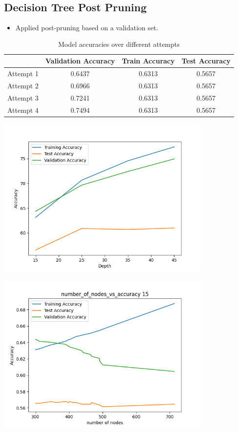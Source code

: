 \documentclass[12pt]{article}
\begin{document}
\subsection{Decision Tree Post Pruning}
    \begin{itemize}
        \item Applied post-pruning based on a validation set.
    \end{itemize}

    \begin{table}[ht]
\centering
\begin{tabular}{@{}lccc@{}}
\toprule
 & Validation Accuracy & Train Accuracy & Test Accuracy \\ 
\midrule
Attempt 1 & 0.6437 & 0.6313 & 0.5657 \\
Attempt 2 & 0.6966 & 0.6313 & 0.5657 \\
Attempt 3 & 0.7241 & 0.6313 & 0.5657 \\
Attempt 4 & 0.7494 & 0.6313 & 0.5657 \\
\bottomrule
\end{tabular}
\caption{Model accuracies over different attempts}
\label{tab:accuracies}
\end{table}

\begin{center}
    \includegraphics[width=0.8\textwidth]{Assignment 3/q1/(c)depth_vs_accuracy after pruning.png}
\end{center}

\begin{center}
    \includegraphics[width=0.8\textwidth]{Assignment 3/q1/(c)number_of_nodes_vs_accuracy 15.png}
\end{center}
\end{document}
